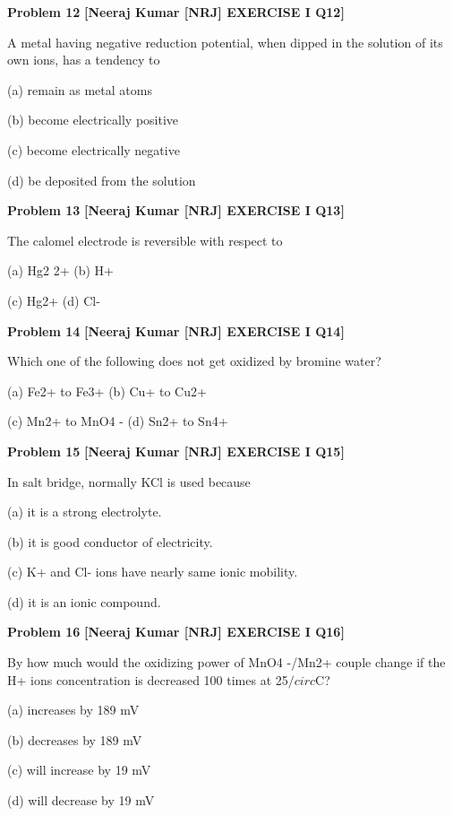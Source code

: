 \begin{problembox}
\textbf{Problem 12} \hfill \textbf{[Neeraj Kumar [NRJ] EXERCISE I Q12]}
\label{q:ext-nrj_all_questions-12}

A metal having negative reduction potential, 
when dipped in the solution of its own ions, has a 
tendency to
 
 (a) remain as metal atoms
 
 (b) become electrically positive
 
 (c) become electrically negative
 
 (d) be deposited from the solution
\end{problembox}

\begin{problembox}
\textbf{Problem 13} \hfill \textbf{[Neeraj Kumar [NRJ] EXERCISE I Q13]}
\label{q:ext-nrj_all_questions-13}

The calomel electrode is reversible with respect to
 
 (a) Hg2
2+ 
(b) H+
 
 (c) Hg2+ 
(d) Cl-
\end{problembox}

\begin{problembox}
\textbf{Problem 14} \hfill \textbf{[Neeraj Kumar [NRJ] EXERCISE I Q14]}
\label{q:ext-nrj_all_questions-14}

Which one of the following does not get oxidized 
by bromine water?
 
 (a) Fe2+ to Fe3+ 
(b) Cu+ to Cu2+
 
 (c) Mn2+ to MnO4
- 
(d) Sn2+ to Sn4+
\end{problembox}

\begin{problembox}
\textbf{Problem 15} \hfill \textbf{[Neeraj Kumar [NRJ] EXERCISE I Q15]}
\label{q:ext-nrj_all_questions-15}

In salt bridge, normally KCl is used because
 
 (a) it is a strong electrolyte.
 
 (b) it is good conductor of electricity.
 
 (c)  K+ and Cl- ions have nearly same ionic 
mobility.
 
 (d) it is an ionic compound.
\end{problembox}

\begin{problembox}
\textbf{Problem 16} \hfill \textbf{[Neeraj Kumar [NRJ] EXERCISE I Q16]}
\label{q:ext-nrj_all_questions-16}

By how much would the oxidizing power of 
MnO4
-/Mn2+ couple change if the H+ ions 
concentration is decreased 100 times at 25$/circ$C?
 
 (a) increases by 189 mV
 
 (b) decreases by 189 mV
 
 (c) will increase by 19 mV
 
 (d) will decrease by 19 mV
\end{problembox}

